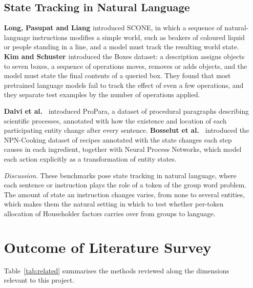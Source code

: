 \subsection{State Tracking in Natural Language}
\textbf{Long, Pasupat and Liang \cite{scone}} introduced SCONE, in which a sequence of natural-language instructions modifies a simple world, such as beakers of coloured liquid or people standing in a line, and a model must track the resulting world state. \textbf{Kim and Schuster \cite{entitytracking}} introduced the Boxes dataset: a description assigns objects to seven boxes, a sequence of operations moves, removes or adds objects, and the model must state the final contents of a queried box. They found that most pretrained language models fail to track the effect of even a few operations, and they separate test examples by the number of operations applied.

\textbf{Dalvi et al.\ \cite{propara}} introduced ProPara, a dataset of procedural paragraphs describing scientific processes, annotated with how the existence and location of each participating entity change after every sentence. \textbf{Bosselut et al.\ \cite{npncooking}} introduced the NPN-Cooking dataset of recipes annotated with the state changes each step causes in each ingredient, together with Neural Process Networks, which model each action explicitly as a transformation of entity states.

\textit{Discussion.} These benchmarks pose state tracking in natural language, where each sentence or instruction plays the role of a token of the group word problem. The amount of state an instruction changes varies, from none to several entities, which makes them the natural setting in which to test whether per-token allocation of Householder factors carries over from groups to language.

\section{Outcome of Literature Survey}
\label{sec:outcome}
Table~\ref{tab:related} summarises the methods reviewed along the dimensions relevant to this project.

